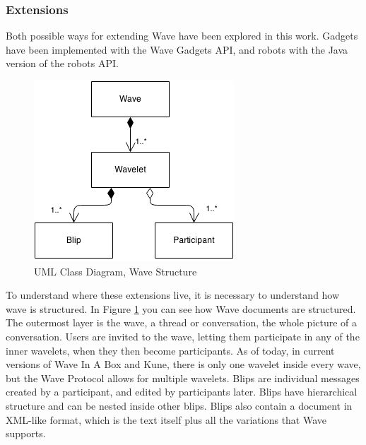 \subsubsection{Extensions}
Both possible ways for extending Wave have been explored in this work. Gadgets have been implemented with the Wave Gadgets API, and robots with the Java version of the robots API.
\begin{figure}[h]
  \center
    \includegraphics[keepaspectratio, scale=0.7]{Media/Diagrams/Wave/Structure.png}
  \caption{UML Class Diagram, Wave Structure}
  \label{fig:wave_structure}
\end{figure}
To understand where these extensions live, it is necessary to understand how wave is structured. In Figure \ref{fig:wave_structure} you can see how Wave documents are structured. The outermost layer is the wave, a thread or conversation, the whole picture of a conversation. Users are invited to the wave, letting them participate in any of the inner wavelets, when they then become participants. As of today, in current versions of Wave In A Box and Kune, there is only one wavelet inside every wave, but the Wave Protocol allows for multiple wavelets. Blips are individual messages created by a participant, and edited by participants later. Blips have hierarchical structure and can be nested inside other blips. Blips also contain a document in XML-like format, which is the text itself plus all the variations that Wave supports.

